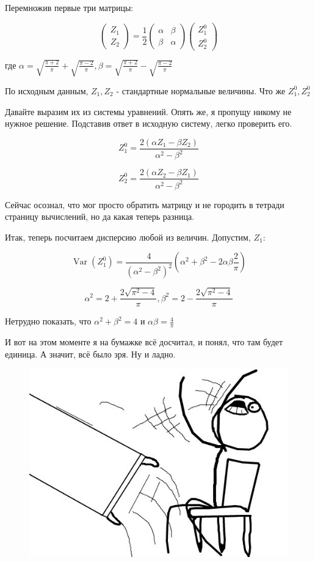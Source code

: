 \documentclass[a4paper,12pt]{article}
\DeclareMathOperator{\Var}{Var}
\begin{document}
Перемножив первые три матрицы:

\[ \begin{pmatrix}
Z_1\\
Z_2
\end{pmatrix} = \frac{1}{2} \begin{pmatrix}
\alpha & \beta\\
\beta & \alpha
\end{pmatrix} 
 \begin{pmatrix}
Z_1^0\\
Z_2^0
\end{pmatrix}\]

где $  \alpha =  \sqrt{\frac{\pi + 2}{\pi}} + \sqrt{\frac{\pi - 2}{\pi}}, \beta =  \sqrt{\frac{\pi + 2}{\pi}} - \sqrt{\frac{\pi - 2}{\pi}}  $

По исходным данным, $ Z_1, Z_2 $ - стандартные нормальные величины. Что же $ Z_1^0, Z_2^0 $ 

Давайте выразим их из системы уравнений. Опять же, я пропущу никому не нужное решение. Подставив ответ в исходную систему, легко проверить его.

\[ Z_1^0 = \frac{2(\alpha Z_1 - \beta Z_2)}{\alpha^2 - \beta^2} \]

\[ Z_2^0 = \frac{2(\alpha Z_2 - \beta Z_1)}{\alpha^2 - \beta^2} \]

Сейчас осознал, что мог просто обратить матрицу и не городить в тетради страницу вычислений, но да какая теперь разница.

Итак, теперь посчитаем дисперсию любой из величин. Допустим, $ Z_1 $:

\[ \Var(Z_1^0) = \frac{4}{(\alpha^2 - \beta^2)^2} (\alpha^2 + \beta^2 - 2\alpha \beta \frac{2}{\pi})\]

\[ \alpha^2 = 2 + \frac{2\sqrt{\pi^2 - 4}}{\pi},  \beta^2 = 2 - \frac{2\sqrt{\pi^2 - 4}}{\pi}  \]

Нетрудно показать, что $ \alpha^2 + \beta^2 = 4 $ и $ \alpha \beta = \frac{4}{\pi} $

И вот на этом моменте я на бумажке всё досчитал, и понял, что там будет единица. А значит, всё было зря. Ну и ладно.

\begin{figure}[h]
	\includegraphics{71}
\end{figure}
\end{document}

